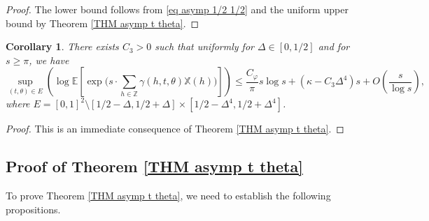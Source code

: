 \documentclass[12pt]{amsart}
\newtheorem{cor}[thm]{Corollary}
\theoremstyle{definition}
\numberwithin{equation}{section}
\numberwithin{equation}{section}
\def\E{\mathbb{E}}
\def\Z{\mathbb{Z}}
\def\Mp{C_\varphi}
\def\X{\mathbb{X}}
\def\E{\mathbb{E}}
\begin{document}
\begin{proof} The lower bound follows from \eqref{eq asymp 1/2 1/2} and the uniform upper bound by Theorem \ref{THM asymp t theta}.
    
\end{proof}

\begin{cor}\label{Cor asymp T Theta} There exists $C_3>0$ such that uniformly for $\Delta \in [0,1/2]$ and for $s\geq \pi$, we have
\begin{equation}\label{eq unif asymp T Theta}
\sup_{(t,\theta) \in E}
\left(
\log 
\E \left[\exp \Big(s \cdot \sum_{h\in \Z}
     \gamma(h,t,\theta)\X(h)\Big) \right]
\right)
     \leq
     \frac{\Mp}{\pi} s \log s+(\kappa-C_3 \Delta^4) s+ O\left(\frac{s}{\log s }\right),
\end{equation}
where $E = [0,1]^2\setminus[1/2-\Delta,1/2+\Delta]\times[1/2-\Delta^4,1/2+\Delta^4]$.

\end{cor}
\begin{proof} This is an immediate consequence of Theorem \ref{THM asymp t theta}.
\end{proof}


\subsection{Proof of Theorem \ref{THM asymp t theta}}\label{section 2.3 preuve thm 2.2}
To prove Theorem \ref{THM asymp t theta}, we need to establish the following propositions.
\end{document}
